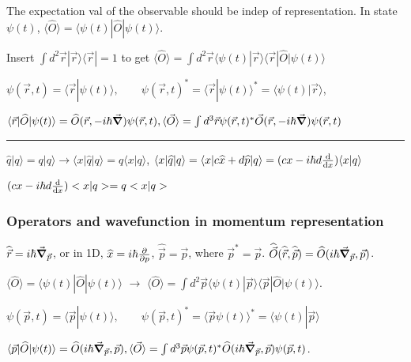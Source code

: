 The expectation val of the observable should be indep of representation. In state $\psi(t)$, $\langle \widehat{O} \rangle = \langle \psi(t) | \widehat{O} | \psi(t) \rangle$.

Insert $\int d^2 \vec{r} | \vec{r} \rangle \langle \vec{r} | = 1$ to get $\langle \widehat{O} \rangle = \int d^2 \vec{r} \langle \psi(t) | \vec{r} \rangle \langle \vec{r} | \widehat{O} | \psi(t) \rangle$

$\psi(\vec{r}, t) = \langle \vec{r} | \psi(t) \rangle, \qquad \psi(\vec{r}, t)^* = \langle \vec{r} | \psi(t) \rangle^* = \langle \psi(t) | \vec{r} \rangle$,

$\langle \vec{r} | \widehat{O} | \psi(t) \rangle = \widehat{O} (\vec{r}, -i \hbar \vec{\grad}) \psi(\vec{r}, t), \langle \vec{O} \rangle = \int d^3 \vec{r} \psi(\vec{r}, t)^* \vec{O}(\vec{r}, -i \hbar \vec{\grad}) \psi(\vec{r}, t)$

\hrule height 0.3pt

\tiny
$\widehat{q} | q \rangle = q | q \rangle \rightarrow \langle x | \widehat{q} | q \rangle = q \langle x | q \rangle$,
$\langle x | \widehat{q} | q \rangle = \langle x | c \widehat{x} + d \widehat{p} | q \rangle = (cx - i \hbar d \dv{}{x}) \langle x | q \rangle$

$(cx - i\hbar d \dv{}{x}) < x | q > = q <x | q>$

\scriptsize

\subsubsection{Operators and wavefunction in momentum representation}

$\widehat{\vec{r}} = i \hbar \vec{\grad}_{\vec{p}}$, or in 1D, $\widehat{x} = i \hbar \pdv{}{p}$, $\widehat{\vec{p}} = \vec{p}$, where $\vec{p}^* = \vec{p}$.
$\widehat{\vec{O}} (\widehat{\vec{r}}, \widehat{\vec{p}}) = \widehat{O} (i \hbar \vec{\grad}_{\vec{p}}, \vec{p})$.

$\langle \widehat{O} \rangle = \langle \psi(t) | \widehat{O} | \psi(t) \rangle$ $\rightarrow$ $\langle \widehat{O} \rangle = \int d^2 \vec{p} \langle \psi(t) | \vec{p} \rangle \langle \vec{p} | \widehat{O} | \psi(t) \rangle$.

$\psi(\vec{p}, t) = \langle \vec{p} | \psi(t) \rangle, \qquad \psi(\vec{p}, t)^* = \langle \vec{p} \psi(t) \rangle^* = \langle \psi(t) | \vec{p} \rangle$

$\langle \vec{p} | \widehat{O} | \psi(t) \rangle = \widehat{O} (i \hbar \vec{\grad}_{\vec{p}}, \vec{p}), \langle \vec{O} \rangle = \int d^3 \vec{p} \psi(\vec{p}, t)^* \widehat{O}(i \hbar \vec{\grad}_{\vec{p}}, \vec{p}) \psi(\vec{p}, t)$.


